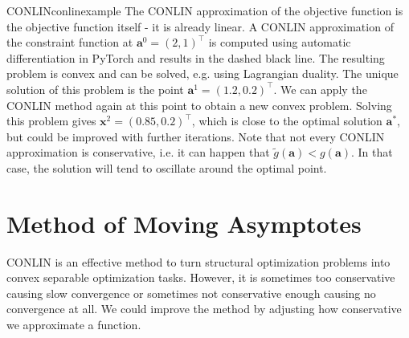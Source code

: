 \begin{example}{CONLIN}{conlinexample}
    The CONLIN approximation of the objective function is the objective function itself - it is already linear. A CONLIN approximation of the constraint function at $\mathbf{a}^0=(2,1)^\top$ is computed using automatic differentiation in PyTorch and results in the dashed black line. The resulting problem is convex and can be solved, e.g. using Lagrangian duality. The unique solution of this problem is the point $\mathbf{a}^1=(1.2,0.2)^\top$. We can apply the CONLIN method again at this point to obtain a new convex problem. Solving this problem gives $\mathbf{x}^2=(0.85,0.2)^\top$, which is close to the optimal solution $\mathbf{a}^*$, but could be improved with further iterations. Note that not every CONLIN approximation is conservative, i.e. it can happen that $\tilde{g}(\mathbf{a}) < g(\mathbf{a})$. In that case, the solution will tend to oscillate around the optimal point. 
    \begin{center}
        
    \end{center}
\end{example}

\section{Method of Moving Asymptotes}
CONLIN is an effective method to turn structural optimization problems into convex separable optimization tasks. However, it is sometimes too conservative causing slow convergence or sometimes not conservative enough causing no convergence at all. We could improve the method by adjusting how conservative we approximate a function.

